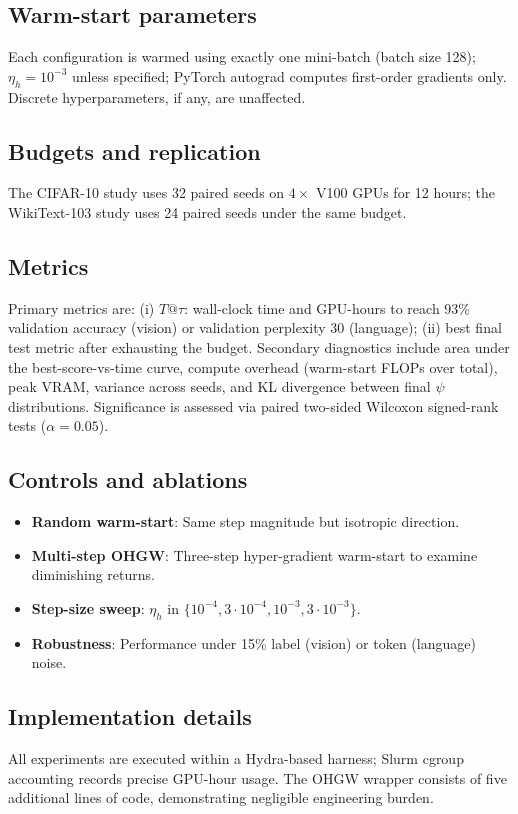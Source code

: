 \documentclass{article}
\begin{document}
\subsection{Warm-start parameters}
Each configuration is warmed using exactly one mini-batch (batch size 128); \(\eta_h = 10^{-3}\) unless specified; PyTorch autograd computes first-order gradients only. Discrete hyperparameters, if any, are unaffected.

\subsection{Budgets and replication}
The CIFAR-10 study uses 32 paired seeds on \(4 \times\) V100 GPUs for 12 hours; the WikiText-103 study uses 24 paired seeds under the same budget.

\subsection{Metrics}
Primary metrics are: (i) \(T@\tau\): wall-clock time and GPU-hours to reach 93\% validation accuracy (vision) or validation perplexity 30 (language); (ii) best final test metric after exhausting the budget. Secondary diagnostics include area under the best-score-vs-time curve, compute overhead (warm-start FLOPs over total), peak VRAM, variance across seeds, and KL divergence between final \(\psi\) distributions. Significance is assessed via paired two-sided Wilcoxon signed-rank tests (\(\alpha = 0.05\)).

\subsection{Controls and ablations}
\begin{itemize}
  \item \textbf{Random warm-start}: Same step magnitude but isotropic direction.
  \item \textbf{Multi-step OHGW}: Three-step hyper-gradient warm-start to examine diminishing returns.
  \item \textbf{Step-size sweep}: \(\eta_h\) in \(\{10^{-4}, 3\cdot10^{-4}, 10^{-3}, 3\cdot10^{-3}\}\).
  \item \textbf{Robustness}: Performance under 15\% label (vision) or token (language) noise.
\end{itemize}

\subsection{Implementation details}
All experiments are executed within a Hydra-based harness; Slurm cgroup accounting records precise GPU-hour usage. The OHGW wrapper consists of five additional lines of code, demonstrating negligible engineering burden.
\end{document}
